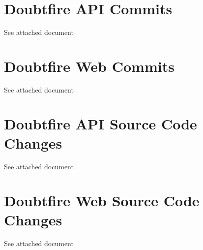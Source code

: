 \documentclass[12pt,a4paper,]{article}
\date{}
\begin{document}
{
\setcounter{tocdepth}{3}
\tableofcontents
}
\newpage
\section{Doubtfire API Commits}\label{doubtfire-api}

See attached document



\newpage
\section{Doubtfire Web Commits}\label{doubtfire-api}

See attached document



\newpage
\section{Doubtfire API Source Code Changes}\label{doubtfire-web}

See attached document



\newpage
\section{Doubtfire Web Source Code Changes}\label{doubtfire-web}

See attached document


\end{document}
